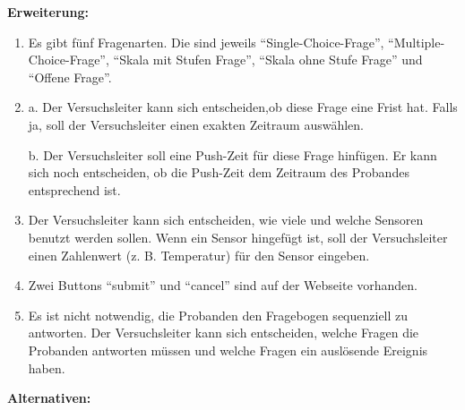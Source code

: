 \documentclass[a4paper]{scrreprt}
\begin{document}
\begin{itemize}
\begin{enumerate}
                \end{enumerate}
                \par \textbf{Erweiterung: }
                \begin{enumerate}
                    \item Es gibt fünf Fragenarten. Die sind jeweils ``Single-Choice-Frage'', ``Multiple-Choice-Frage'', ``Skala mit Stufen Frage'', ``Skala ohne Stufe Frage'' und ``Offene Frage''.
                    \item a. Der Versuchsleiter kann sich entscheiden,ob diese Frage eine Frist hat. Falls ja, soll der Versuchsleiter  einen exakten Zeitraum auswählen.
                    \par b. Der Versuchsleiter soll eine Push-Zeit für diese Frage hinfügen. Er kann sich noch entscheiden, ob die Push-Zeit dem Zeitraum des Probandes entsprechend ist.
                    \item Der Versuchsleiter kann sich entscheiden, wie viele und welche Sensoren benutzt werden sollen. Wenn ein Sensor hingefügt ist, soll der Versuchsleiter einen Zahlenwert (z. B. Temperatur) für den Sensor eingeben.
                    \item Zwei Buttons ``submit'' und ``cancel'' sind auf der Webseite vorhanden.
                    \item Es ist nicht notwendig, die Probanden den Fragebogen sequenziell zu antworten. Der Versuchsleiter kann sich entscheiden, welche Fragen die Probanden antworten müssen und welche Fragen ein auslösende Ereignis haben.
                \end{enumerate}
                \par \textbf{Alternativen: }
    

\end{itemize}
\end{document}
